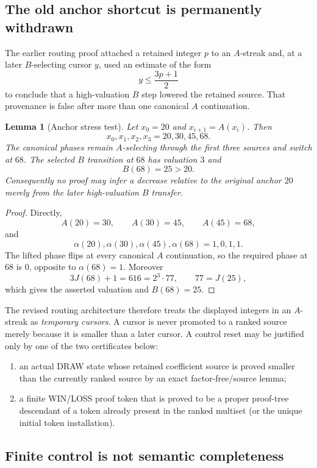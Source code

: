 \documentclass[11pt]{article}
\newtheorem{lemma}[theorem]{Lemma}
\begin{document}
\subsection{The old anchor shortcut is permanently withdrawn}

The earlier routing proof attached a retained integer $p$ to an $A$-streak and,
at a later $B$-selecting cursor $y$, used an estimate of the form
\[
 y\le \frac{3p+1}{2}
\]
to conclude that a high-valuation $B$ step lowered the retained source.  That
provenance is false after more than one canonical $A$ continuation.

\begin{lemma}[Anchor stress test]\label{lem:anchor-stress}
Let $x_0=20$ and $x_{i+1}=A(x_i)$.  Then
\[
 x_0,x_1,x_2,x_3=20,30,45,68.
\]
The canonical phases remain $A$-selecting through the first three sources and
switch at $68$.  The selected $B$ transition at $68$ has valuation $3$ and
\[
 B(68)=25>20.
\]
Consequently no proof may infer a decrease relative to the original anchor
$20$ merely from the later high-valuation $B$ transfer.
\end{lemma}

\begin{proof}
Directly,
\[
 A(20)=30,\qquad A(30)=45,\qquad A(45)=68,
\]
and
\[
 \alpha(20),\alpha(30),\alpha(45),\alpha(68)=1,0,1,1.
\]
The lifted phase flips at every canonical $A$ continuation, so the required
phase at $68$ is $0$, opposite to $\alpha(68)=1$.  Moreover
\[
 3J(68)+1=616=2^3\cdot77,
 \qquad 77=J(25),
\]
which gives the asserted valuation and $B(68)=25$.
\end{proof}

The revised routing architecture therefore treats the displayed integers in an
$A$-streak as \emph{temporary cursors}.  A cursor is never promoted to a ranked
source merely because it is smaller than a later cursor.  A control reset may
be justified only by one of the two certificates below:
\begin{enumerate}[label=(R\arabic*)]
\item an actual DRAW state whose retained coefficient source is proved smaller
than the currently ranked source by an exact factor-free/source lemma;
\item a finite WIN/LOSS proof token that is proved to be a proper proof-tree
descendant of a token already present in the ranked multiset (or the unique
initial token installation).
\end{enumerate}

\subsection{Finite control is not semantic completeness}
\end{document}
